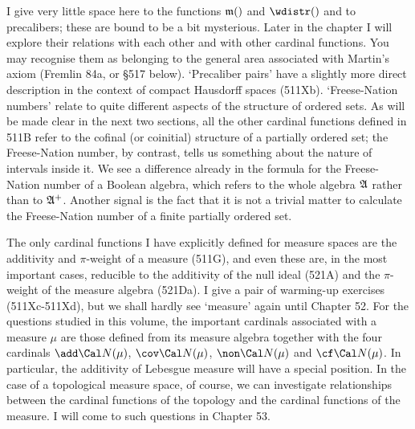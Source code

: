 {I give very little space here to the functions $\frak m()$ and
$\wdistr()$ and to precalibers;   these are bound to be a bit
mysterious.   Later in the chapter I will explore their relations
with each other and with other cardinal functions.   You may recognise
them as belonging to the general area associated with Martin's axiom
({\smc Fremlin 84a}, or \S517 below).   `Precaliber pairs' have a
slightly more direct description in the context of compact Hausdorff
spaces (511Xb).   `Freese-Nation numbers' relate to quite different
aspects of the structure of ordered sets.   As will be made
clear in the next two sections, all the other cardinal functions defined
in 511B refer to the cofinal (or coinitial) structure of a partially
ordered set;  the Freese-Nation number, by contrast, tells us something
about the nature of intervals inside it.   We see a difference already
in the formula for the
Freese-Nation number of a Boolean algebra, which refers to the whole
algebra $\frak A$ rather than to $\frak A^+$.   Another
signal is the fact that it is not a trivial matter to calculate the
Freese-Nation number of a finite partially ordered set.

The only cardinal functions I have explicitly defined for measure spaces
are the additivity and $\pi$-weight of a measure (511G), and even these
are, in the most
important cases, reducible to the additivity of the null ideal (521A) and
the $\pi$-weight of the measure algebra (521Da).
I give a pair of warming-up exercises (511Xc-511Xd),
but we shall hardly see `measure' again until Chapter 52.
For the questions studied in this volume, the important
cardinals associated with a measure $\mu$ are those defined from its
measure algebra together with the four cardinals $\add\Cal N(\mu)$,
$\cov\Cal N(\mu)$, $\non\Cal N(\mu)$ and $\cf\Cal N(\mu)$.   In
particular, the
additivity of Lebesgue measure will have a special position.   In the
case of a topological measure space, of course, we can investigate
relationships between the cardinal functions of the topology and the
cardinal functions of the measure.   I will come to such questions in
Chapter 53.
}%

\discrpage

